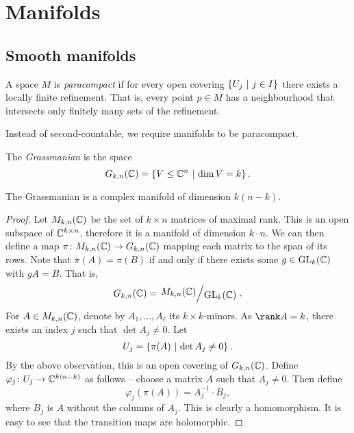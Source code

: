 \section{Manifolds}

\subsection{Smooth manifolds}


\begin{definicija}
A space $M$ is \emph{paracompact} if for every
open covering $\left\{U_j~\middle\vert~j \in I\right\}$ there exists a locally finite
refinement. That is, every point $p \in M$ has a neighbourhood that
intersects only finitely many sets of the refinement.
\end{definicija}

\begin{opomba}
Instead of second-countable, we require manifolds to be
paracompact.
\end{opomba}

\begin{definicija}
The \emph{Grassmanian} is the space
\[
G_{k,n}(\mathbb{C}) =
\left\{V \leq \mathbb{C}^n~\middle\vert~\dim V = k\right\}.
\]
\end{definicija}

\begin{trditev}
The Grassmanian is a complex manifold of dimension $k (n-k)$.
\end{trditev}

\begin{proof}
Let $M_{k,n}(\mathbb{C})$ be the set of $k \times n$ matrices of maximal
rank. This is an open subspace of $\mathbb{C}^{k \times n}$, therefore it
is a manifold of dimension $k \cdot n$. We can then define a map
$\pi \colon M_{k,n}(\mathbb{C}) \to G_{k,n}(\mathbb{C})$ mapping each matrix to the
span of its rows. Note that $\pi(A) = \pi(B)$ if and only if there
exists some $g \in \operatorname{GL}_k(\mathbb{C})$ with $gA = B$. That is,
\[
G_{k,n}(\C) = \kvoc{M_{k,n}(\C)}{\GL_k(\C)}.
\]
For $A \in M_{k,n}(\mathbb{C})$, denote by $A_1, \dots, A_\ell$ its
$k \times k$-minors. As $\rank A = k$, there exists an index $j$
such that $\det A_j \ne 0$. Let
\[
U_j = \left\{\pi(A)~\middle\vert~\det A_j \ne 0\right\}.
\]
By the above observation, this is an open covering of
$G_{k,n}(\mathbb{C})$. Define $\varphi_j \colon U_j \to \mathbb{C}^{k(n-k)}$ as
follows -- choose a matrix $A$ such that $A_j \ne 0$. Then define
\[
\varphi_j(\pi(A)) = A_j^{-1} \cdot B_j,
\]
where $B_j$ is $A$ without the columns of $A_j$. This is clearly a
homomorphism. It is easy to see that the transition maps are
holomorphic.
\end{proof}


